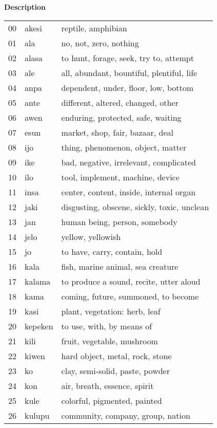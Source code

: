 \documentclass[11pt]{article}
\begin{document}
{\begin{center}
\textbf{Description}
\end{center}
\tiny
\begin{multicols}{2}[]
\begin{center}
\begin{tabularx}{\linewidth}{rlX}
00 & akesi & reptile, amphibian\\
01 & ala & no, not, zero, nothing\\
02 & alasa & to hunt, forage, seek, try to, attempt\\
03 & ale & all, abundant, bountiful, plentiful, life\\
04 & anpa & dependent, under, floor, low, bottom\\
05 & ante & different, altered, changed, other\\
06 & awen & enduring, protected, safe, waiting\\
07 & esun & market, shop, fair, bazaar, deal\\
08 & ijo & thing, phenomenon, object, matter\\
09 & ike & bad, negative, irrelevant, complicated\\
10 & ilo & tool, implement, machine, device\\
11 & insa & center, content, inside, internal organ\\
12 & jaki & disgusting, obscene, sickly, toxic, unclean\\
13 & jan & human being, person, somebody\\
14 & jelo & yellow, yellowish\\
15 & jo & to have, carry, contain, hold\\
16 & kala & fish, marine animal, sea creature\\
17 & kalama & to produce a sound, recite, utter aloud\\
18 & kama & coming, future, summoned, to become\\
19 & kasi & plant, vegetation: herb, leaf\\
20 & kepeken & to use, with, by means of\\
21 & kili & fruit, vegetable, mushroom\\
22 & kiwen & hard object, metal, rock, stone\\
23 & ko & clay, semi-solid, paste, powder\\
24 & kon & air, breath, essence, spirit\\
25 & kule & colorful, pigmented, painted\\
26 & kulupu & community, company, group, nation\\

\end{tabularx}
\end{center}
\end{multicols}}
\end{document}
